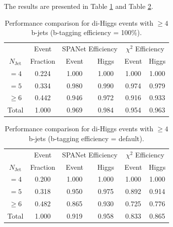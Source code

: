 \documentclass[12pt]{article}
\begin{document}
		The results are presented in Table \ref{tab:comparison_SPANet_and_chi2_diHiggs_with_btag_100} and Table \ref{tab:comparison_SPANet_and_chi2_diHiggs_with_btag_default}.

		\begin{table}[htpb]
			\centering
			\caption{Performance comparison for di-Higgs events with $\ge 4$ b-jets (b-tagging efficiency = 100\%).}
			\label{tab:comparison_SPANet_and_chi2_diHiggs_with_btag_100}
			\begin{tabular}{c|c|cc|cc}
					  & Event    & \multicolumn{2}{|c|}{SPANet Efficiency} & \multicolumn{2}{|c}{ $\chi^2$ Efficiency} \\
				$N_\text{Jet}$ & Fraction & Event             & Higgs             & Event            & Higgs           \\
				\hline
				$=4$	  &   0.224       &     1.000       &   1.000       &   1.000           &    1.000          \\
				$=5$	  &   0.334       &     0.980       &   0.990       &   0.974           &    0.979          \\
				$\ge 6$	  &   0.442       &     0.946       &   0.972		&   0.916           &    0.933          \\
				Total	  &   1.000       &     0.969       &   0.984       &   0.954           &    0.963            
			\end{tabular}
		\end{table}

		\begin{table}[htpb]
			\centering
			\caption{Performance comparison for di-Higgs events with $\ge 4$ b-jets (b-tagging efficiency = default).}
			\label{tab:comparison_SPANet_and_chi2_diHiggs_with_btag_default}
			\begin{tabular}{c|c|cc|cc}
					  & Event    & \multicolumn{2}{|c|}{SPANet Efficiency} & \multicolumn{2}{|c}{ $\chi^2$ Efficiency} \\
				$N_\text{Jet}$ & Fraction & Event             & Higgs             & Event            & Higgs           \\
				\hline
				$=4$	  &   0.200       &     1.000       &   1.000       &   1.000           &    1.000          \\
				$=5$	  &   0.318       &     0.950       &   0.975       &   0.892           &    0.914          \\
				$\ge 6$	  &   0.482       &     0.865       &   0.930		&   0.725           &    0.776          \\
				Total	  &   1.000       &     0.919       &   0.958       &   0.833           &    0.865            
			\end{tabular}
		\end{table}
\end{document}
